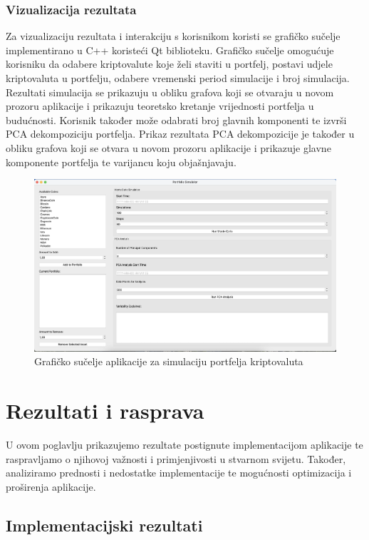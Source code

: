 \documentclass[zavrsnirad]{fer}
\begin{document}
\subsection{Vizualizacija rezultata}
\label{sek:vizualizacija_rezultata}
Za vizualizaciju rezultata i interakciju s korisnikom koristi se
grafičko sučelje implementirano u C++ koristeći Qt biblioteku.
Grafičko sučelje omogućuje korisniku da odabere kriptovalute koje želi
staviti u portfelj, postavi udjele kriptovaluta u portfelju,
odabere vremenski period simulacije i broj simulacija.
Rezultati simulacija se prikazuju u obliku grafova koji
se otvaraju u novom prozoru aplikacije i prikazuju teoretsko kretanje
vrijednosti portfelja u budućnosti. Korisnik također može odabrati
broj glavnih komponenti te izvrši PCA dekompoziciju portfelja. Prikaz
rezultata PCA dekompozicije je također u obliku grafova koji
se otvara u novom prozoru aplikacije i prikazuje glavne komponente
portfelja te varijancu koju objašnjavaju.
\begin{figure}[H]
    \centering
    \includegraphics[width=1.0\textwidth]{Figures/gui.png}
    \caption{Grafičko sučelje aplikacije za simulaciju portfelja kriptovaluta}
    \label{fig:portfolio_gui}
\end{figure}

\chapter{Rezultati i rasprava}
\label{pog:rezultati_i_rasprava}
U ovom poglavlju prikazujemo rezultate postignute implementacijom aplikacije
te raspravljamo o njihovoj važnosti i primjenjivosti u stvarnom svijetu.
Također, analiziramo prednosti i nedostatke implementacije te mogućnosti
optimizacija i proširenja aplikacije.
\section{Implementacijski rezultati}
\label{sek:implementacijski_rezultati}
\end{document}
